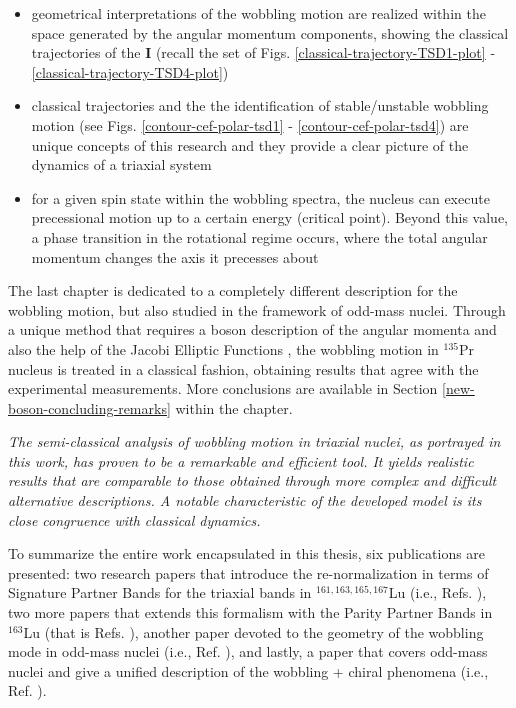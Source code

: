 \begin{itemize}
    \item geometrical interpretations of the wobbling motion are realized within the space generated by the angular momentum components, showing the classical trajectories of the $\mathbf{I}$ (recall the set of Figs. \ref{classical-trajectory-TSD1-plot} - \ref{classical-trajectory-TSD4-plot})
    \item classical trajectories and the the identification of stable/unstable wobbling motion (see Figs. \ref{contour-cef-polar-tsd1} - \ref{contour-cef-polar-tsd4}) are unique concepts of this research and they provide a clear picture of the dynamics of a triaxial system
    \item for a given spin state within the wobbling spectra, the nucleus can execute precessional motion up to a certain energy (critical point). Beyond this value, a phase transition in the rotational regime occurs, where the total angular momentum changes the axis it precesses about
\end{itemize}

The last chapter is dedicated to a completely different description for the wobbling motion, but also studied in the framework of odd-mass nuclei. Through a unique method that requires a boson description of the angular momenta and also the help of the Jacobi Elliptic Functions \cite{jacobi1829fundamenta}, the wobbling motion in $^{135}$Pr nucleus is treated in a classical fashion, obtaining results that agree with the experimental measurements. More conclusions are available in Section \ref{new-boson-concluding-remarks} within the chapter.

\emph{The semi-classical analysis of wobbling motion in triaxial nuclei, as portrayed in this work, has proven to be a remarkable and efficient tool. It yields realistic results that are comparable to those obtained through more complex and difficult alternative descriptions. A notable characteristic of the developed model is its close congruence with classical dynamics.}

To summarize the entire work encapsulated in this thesis, six publications are presented: two research papers that introduce the re-normalization in terms of Signature Partner Bands for the triaxial bands in $^{161,163,165,167}$Lu (i.e., Refs. \cite{raduta2020approach,raduta2020towards}), two more papers that extends this formalism with the Parity Partner Bands in $^{163}$Lu (that is Refs. \cite{poenaru2021parity,poenaru2021extensive1}), another paper devoted to the geometry of the wobbling mode in odd-mass nuclei (i.e., Ref. \cite{poenaru2021extensive2}), and lastly, a paper that covers odd-mass nuclei and give a unified description of the wobbling + chiral phenomena (i.e., Ref. \cite{raduta2020new}). %

